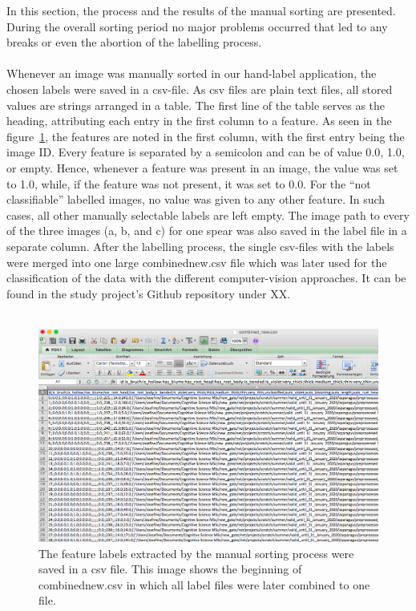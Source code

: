 In this section, the process and the results of the manual sorting are presented.
During the overall sorting period no major problems occurred that led to any breaks or even the abortion of the labelling process. \\
\\
Whenever an image was manually sorted in our hand-label application, the chosen labels were saved in a csv-file. As csv files are plain text files, all stored values are strings arranged in a table. The first line of the table serves as the heading, attributing each entry in the first column to a feature. As seen in the figure~\ref{fig:CSVfileOverview}, the features are noted in the first column, with the first entry being the image ID. Every feature is separated by a semicolon and can be of value 0.0, 1.0, or empty. Hence, whenever a feature was present in an image, the value was set to 1.0, while, if the feature was not present, it was set to 0.0. For the “not classifiable” labelled images, no value was given to any other feature. In such cases, all other manually selectable labels are left empty. The image path to every of the three images (a, b, and c) for one spear was also saved in the label file in a separate column. After the labelling process, the single csv-files with the labels were merged into one large combined\textunderscore new.csv file which was later used for the classification of the data with the different computer-vision approaches. It can be found in the study project’s Github repository under XX. \\
\\
\begin{figure}[h]
	\centering
	\includegraphics[scale=0.4]{Figures/chapter03/csv_overview}
	\decoRule
	\caption[Manual labelling output csv-file]{The feature labels extracted by the manual sorting process were saved in a csv file. This image shows the beginning of combined\textunderscore new.csv in which all label files were later combined to one file.}
	\label{fig:CSVfileOverview}
\end{figure}
